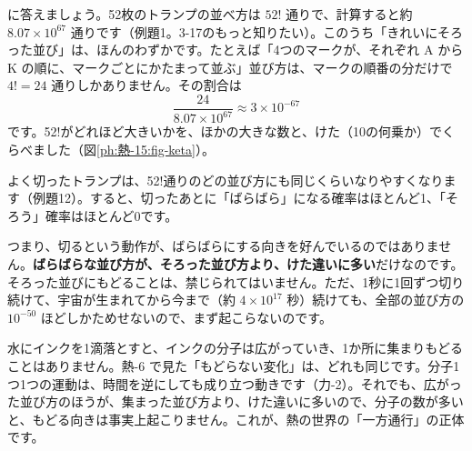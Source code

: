 \label{ph:熱-15:hatena}\bkhatenaref に答えましょう。52枚のトランプの並べ方は $52!$ 通りで、計算すると約 $8.07\times10^{67}$ 通りです（例題1。3-17のもっと知りたい）。このうち「きれいにそろった並び」は、ほんのわずかです。たとえば「4つのマークが、それぞれ A から K の順に、マークごとにかたまって並ぶ」並び方は、マークの順番の分だけで $4!=24$ 通りしかありません。その割合は
\[\frac{24}{8.07\times10^{67}}\approx3\times10^{-67}\]
です。52!がどれほど大きいかを、ほかの大きな数と、けた（10の何乗か）でくらべました（図\ref{ph:熱-15:fig-keta}）。
\begin{bkfigure}
\label{ph:熱-15:fig-keta}
\end{bkfigure}
よく切ったトランプは、52!通りのどの並び方にも同じくらいなりやすくなります（例題12）。すると、切ったあとに「ばらばら」になる確率はほとんど1、「そろう」確率はほとんど0です。

つまり、切るという動作が、ばらばらにする向きを好んでいるのではありません。\textbf{ばらばらな並び方が、そろった並び方より、けた違いに多い}だけなのです。そろった並びにもどることは、禁じられてはいません。ただ、1秒に1回ずつ切り続けて、宇宙が生まれてから今まで（約 $4\times10^{17}$ 秒）続けても、全部の並び方の $10^{-50}$ ほどしかためせないので、まず起こらないのです。

\begin{phmijika}
水にインクを1滴落とすと、インクの分子は広がっていき、1か所に集まりもどることはありません。熱-6 で見た「もどらない変化」は、どれも同じです。分子1つ1つの運動は、時間を逆にしても成り立つ動きです（力-2）。それでも、広がった並び方のほうが、集まった並び方より、けた違いに多いので、分子の数が多いと、もどる向きは事実上起こりません。これが、熱の世界の「一方通行」の正体です。
\end{phmijika}

